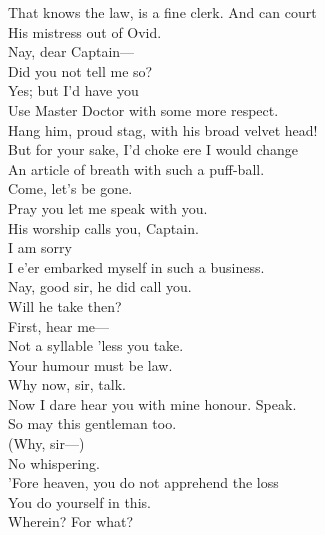\documentclass[a4paper,oneside,12pt]{memoir}
\begin{document}
\begin{drama*}
That knows the law, is a fine clerk. And can court\\
His mistress out of Ovid.\\
\dapperspeaks {} Nay, dear Captain---\\
\facespeaks Did you not tell me so?\\
\dapperspeaks {} Yes; but I'd have you\\
Use Master Doctor with some more respect.\\
\facespeaks Hang him, proud stag, with his broad velvet head!\\
But for your sake, I'd choke ere I would change\\
An article of breath with such a puff-ball.\\
Come, let's be gone.\\
\subtlespeaks {} Pray you let me speak with you.\\
\dapperspeaks His worship calls you, Captain.\\
\facespeaks {} I am sorry\\
I e'er embarked myself in such a business.\\
\dapperspeaks Nay, good sir, he did call you.\\
\facespeaks {} Will he take then?\\
\subtlespeaks First, hear me---\\
\facespeaks {} Not a syllable 'less you take.\\
\subtlespeaks Your humour must be law.\\
\facespeaks {} Why now, sir, talk.\\
Now I dare hear you with mine honour. Speak.\\
So may this gentleman too.\\
\subtlespeaks {} (Why, sir---)\\
\facespeaks {} No whispering.\\
\subtlespeaks 'Fore heaven, you do not apprehend the loss\\
You do yourself in this.\\
\facespeaks {} Wherein? For what?\\

\end{drama*}
\end{document}

